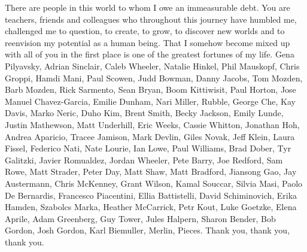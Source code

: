 There are people in this world to whom I owe an immeasurable debt. You are teachers, friends and colleagues who throughout this journey have humbled me, challenged me to question, to create, to grow, to discover new worlds and to reenvision my potential as a human being. That I somehow become mixed up with all of you in the first place is one of the greatest fortunes of my life.
\newline\newline
Gena Pilyavsky, Adrian Sinclair, Caleb Wheeler, Natalie Hinkel, Phil Mauskopf, Chris Groppi, Hamdi Mani, Paul Scowen, Judd Bowman, Danny Jacobs, Tom Mozden, Barb Mozden, Rick Sarmento, Sean Bryan, Boom Kittiwisit, Paul Horton, Jose Manuel Chavez-Garcia, Emilie Dunham, Nari Miller, Rubble, George Che, Kay Davis, Marko Neric, Duho Kim, Brent Smith, Becky Jackson, Emily Lunde, Justin Mathewson, Matt Underhill, Eric Weeks, Cassie Whitton, Jonathan Hoh, Andrea Aparicio, Tracee Jamison, Mark Devlin, Giles Novak, Jeff Klein, Laura Fissel, Federico Nati, Nate Lourie, Ian Lowe, Paul Williams, Brad Dober, Tyr Galitzki, Javier Romualdez, Jordan Wheeler, Pete Barry, Joe Redford, Sam Rowe, Matt Strader, Peter Day, Matt Shaw, Matt Bradford, Jiansong Gao, Jay Austermann, Chris McKenney, Grant Wilson, Kamal Souccar, Silvia Masi, Paolo De Bernardis, Francesco Piacentini, Ellia Battistelli, David Schiminovich, Erika Hamden, Szabolcs Marka, Heather McCarrick, Petr Kout, Luke Goetzke, Elena Aprile, Adam Greenberg, Guy Tower, Jules Halpern, Sharon Bender, Bob Gordon, Josh Gordon, Karl Biemuller, Merlin, Pieces.
\newline\newline
Thank you, thank you, thank you.
